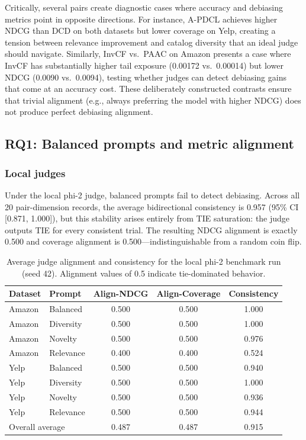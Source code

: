 \documentclass[pdflatex,sn-basic,referee,lineno]{sn-jnl}
\begin{document}
Critically, several pairs create diagnostic cases where accuracy and debiasing metrics point in opposite directions. For instance, A-PDCL achieves higher NDCG than DCD on both datasets but lower coverage on Yelp, creating a tension between relevance improvement and catalog diversity that an ideal judge should navigate. Similarly, InvCF vs.\ PAAC on Amazon presents a case where InvCF has substantially higher tail exposure (0.00172 vs.\ 0.00014) but lower NDCG (0.0090 vs.\ 0.0094), testing whether judges can detect debiasing gains that come at an accuracy cost. These deliberately constructed contrasts ensure that trivial alignment (e.g., always preferring the model with higher NDCG) does not produce perfect debiasing alignment.

\subsection{RQ1: Balanced prompts and metric alignment}

\subsubsection{Local judges}

Under the local phi-2 judge, balanced prompts fail to detect debiasing. Across all 20 pair-dimension records, the average bidirectional consistency is 0.957 (95\% CI [0.871, 1.000]), but this stability arises entirely from TIE saturation: the judge outputs TIE for every consistent trial. The resulting NDCG alignment is exactly 0.500 and coverage alignment is 0.500---indistinguishable from a random coin flip.

\begin{table}[t]
\centering
\caption{Average judge alignment and consistency for the local phi-2 benchmark run (seed 42). Alignment values of 0.5 indicate tie-dominated behavior.}
\label{tab:main_alignment}
\begin{tabular}{llccc}
\toprule
Dataset & Prompt & Align-NDCG & Align-Coverage & Consistency \\
\midrule
Amazon & Balanced & 0.500 & 0.500 & 1.000 \\
Amazon & Diversity & 0.500 & 0.500 & 1.000 \\
Amazon & Novelty & 0.500 & 0.500 & 0.976 \\
Amazon & Relevance & 0.400 & 0.400 & 0.524 \\
Yelp & Balanced & 0.500 & 0.500 & 0.940 \\
Yelp & Diversity & 0.500 & 0.500 & 1.000 \\
Yelp & Novelty & 0.500 & 0.500 & 0.936 \\
Yelp & Relevance & 0.500 & 0.500 & 0.944 \\
\midrule
\multicolumn{2}{l}{Overall average} & 0.487 & 0.487 & 0.915 \\
\bottomrule
\end{tabular}
\end{table}
\end{document}
